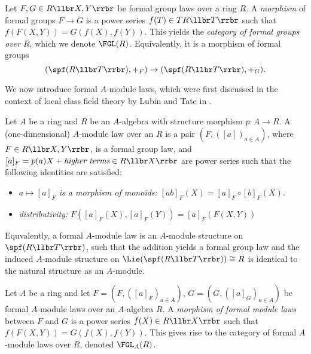 \documentclass[../main.tex]{subfiles}
\begin{document}
\begin{defi}
    Let $F, G \in R\llbr X, Y \rrbr$ be formal group laws over
    a ring $R$. A \textit{morphism} of formal groups
    $F \to G$ is a power series $f(T) \in T R\llbr T \rrbr$ such that
    $f(F(X,Y)) = G(f(X), f(Y))$. This yields the
    \emph{category of formal groups over $R$}, which we denote $\FGL(R)$. 
    Equivalently, it is a morphism of formal groups
    \begin{equation*}
        (\spf(R\llbr T \rrbr), +_F) \to (\spf(R\llbr T \rrbr), +_G).
    \end{equation*}
\end{defi}

We now introduce formal $A$-module laws, which were first discussed in the context 
of local class field theory by Lubin and Tate in \cite{LubinTateFormalMult}.

\begin{defi}
    Let $A$ be a ring and $R$ be an $A$-algebra with structure
    morphism $p: A \to R$. A (one-dimensional) $A$-module law over an $R$ is a
    pair $(F, ([a])_{a \in A})$, where $F \in R\llbr X,Y \rrbr$, is 
    a formal group law, and $[a]_F = p(a)X + \textit{higher terms}
    \in R\llbr X \rrbr$ are power
    series such that the following identities are satisfied:
    \begin{itemize}
        \item \textit{$a \mapsto [a]_F$ is a morphism of monoids:} $[ab]_F(X) = 
            [a]_F \circ [b]_F(X)$.
        \item \textit{distributivity:} $F([a]_F(X), [a]_F(Y)) = [a]_F(F(X,Y))$
    \end{itemize}
    Equvalently, a formal $A$-module law is an $A$-module structure on 
    $\spf(R\llbr T \rrbr)$, such that the addition yields a formal group law
    and the induced $A$-module structure on 
    $\Lie(\spf(R \llbr T \rrbr)) \cong R$ is identical to the natural structure 
    as an $A$-module.
\end{defi}

\begin{defi}
    Let $A$ be a ring and let $F = (F, ([a]_F)_{a\in A})$, $G = (G, ([a]_G)_{a
    \in A})$ be formal $A$-module laws over an $A$-algebra $R$. A
    \textit{morphism of formal module laws} between $F$ and $G$ is a power
    series $f(X) \in R\llbr X \rrbr$ such that
    $f(F(X,Y)) = G(f(X),f(Y))$. This gives rise to the category of formal
    $A$-module laws over $R$, denoted $\FGL_A(R)$. 
\end{defi}
\end{document}
